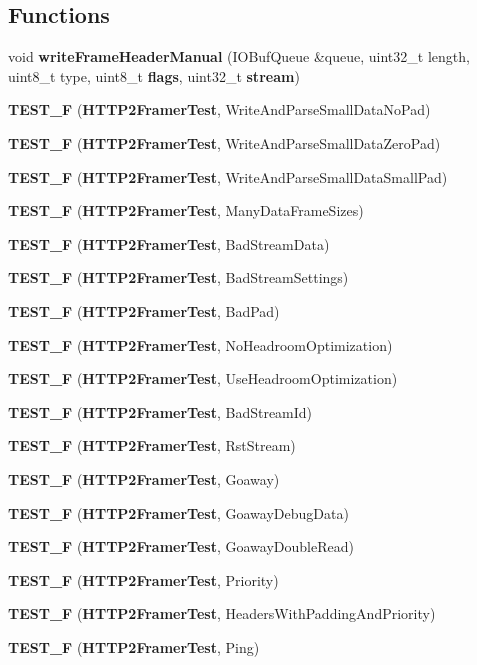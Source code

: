 \subsection*{Functions}
\begin{DoxyCompactItemize}
\item 
void {\bf write\+Frame\+Header\+Manual} (I\+O\+Buf\+Queue \&queue, uint32\+\_\+t length, uint8\+\_\+t type, uint8\+\_\+t {\bf flags}, uint32\+\_\+t {\bf stream})
\item 
{\bf T\+E\+S\+T\+\_\+F} ({\bf H\+T\+T\+P2\+Framer\+Test}, Write\+And\+Parse\+Small\+Data\+No\+Pad)
\item 
{\bf T\+E\+S\+T\+\_\+F} ({\bf H\+T\+T\+P2\+Framer\+Test}, Write\+And\+Parse\+Small\+Data\+Zero\+Pad)
\item 
{\bf T\+E\+S\+T\+\_\+F} ({\bf H\+T\+T\+P2\+Framer\+Test}, Write\+And\+Parse\+Small\+Data\+Small\+Pad)
\item 
{\bf T\+E\+S\+T\+\_\+F} ({\bf H\+T\+T\+P2\+Framer\+Test}, Many\+Data\+Frame\+Sizes)
\item 
{\bf T\+E\+S\+T\+\_\+F} ({\bf H\+T\+T\+P2\+Framer\+Test}, Bad\+Stream\+Data)
\item 
{\bf T\+E\+S\+T\+\_\+F} ({\bf H\+T\+T\+P2\+Framer\+Test}, Bad\+Stream\+Settings)
\item 
{\bf T\+E\+S\+T\+\_\+F} ({\bf H\+T\+T\+P2\+Framer\+Test}, Bad\+Pad)
\item 
{\bf T\+E\+S\+T\+\_\+F} ({\bf H\+T\+T\+P2\+Framer\+Test}, No\+Headroom\+Optimization)
\item 
{\bf T\+E\+S\+T\+\_\+F} ({\bf H\+T\+T\+P2\+Framer\+Test}, Use\+Headroom\+Optimization)
\item 
{\bf T\+E\+S\+T\+\_\+F} ({\bf H\+T\+T\+P2\+Framer\+Test}, Bad\+Stream\+Id)
\item 
{\bf T\+E\+S\+T\+\_\+F} ({\bf H\+T\+T\+P2\+Framer\+Test}, Rst\+Stream)
\item 
{\bf T\+E\+S\+T\+\_\+F} ({\bf H\+T\+T\+P2\+Framer\+Test}, Goaway)
\item 
{\bf T\+E\+S\+T\+\_\+F} ({\bf H\+T\+T\+P2\+Framer\+Test}, Goaway\+Debug\+Data)
\item 
{\bf T\+E\+S\+T\+\_\+F} ({\bf H\+T\+T\+P2\+Framer\+Test}, Goaway\+Double\+Read)
\item 
{\bf T\+E\+S\+T\+\_\+F} ({\bf H\+T\+T\+P2\+Framer\+Test}, Priority)
\item 
{\bf T\+E\+S\+T\+\_\+F} ({\bf H\+T\+T\+P2\+Framer\+Test}, Headers\+With\+Padding\+And\+Priority)
\item 
{\bf T\+E\+S\+T\+\_\+F} ({\bf H\+T\+T\+P2\+Framer\+Test}, Ping)

\end{DoxyCompactItemize}
